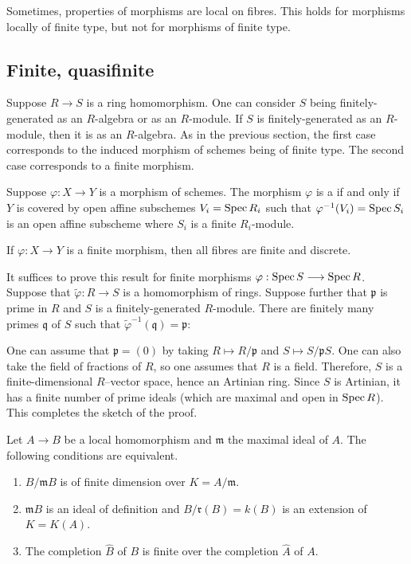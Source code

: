 \documentclass [11 pt, oneside] {article}
\begin{document}
\begin{remark}
	Sometimes, properties of morphisms are local on fibres. This holds for morphisms locally of finite type, but not for morphisms of finite type.
\end{remark}

\subsection{Finite, quasifinite}
Suppose $R\longrightarrow S$ is a ring homomorphism. One can consider $S$ being finitely-generated as an $R$-algebra or as an $R$-module. If $S$ is finitely-generated as an $R$-module, then it is as an $R$-algebra. As in the previous section, the first case corresponds to the induced morphism of schemes being of finite type. The second case corresponds to a finite morphism.

Suppose $\varphi:X\longrightarrow Y$ is a morphism of schemes. The morphism $\varphi$ is a  if and only if $Y$ is covered by open affine subschemes $V_i = \operatorname{Spec} R_i$ such that $\varphi^{-1}(V_i) =\operatorname{Spec} S_i$ is an open affine subscheme where $S_i$ is a finite $R_i$-module. 

\begin{proposition}
If $\varphi:X\longrightarrow Y$ is a finite morphism, then all fibres are finite and discrete.
\end{proposition}

It suffices to prove this result for finite morphisms $\varphi: \operatorname{Spec} S\longrightarrow \operatorname{Spec} R$. Suppose that $\tilde\varphi :R\longrightarrow S$ is a homomorphism of rings. Suppose further that $\mathfrak{p}$ is prime in $R$ and $S$ is a finitely-generated $R$-module. There are finitely many primes $\mathfrak{q}$ of $S$ such that $\tilde\varphi^{-1}(\mathfrak{q})=\mathfrak{p}$: 

One can assume that $\mathfrak{p}=(0)$ by taking $R \longmapsto R/\mathfrak{p}$ and $S\longmapsto S/\mathfrak{p}S$. One can also take the field of fractions of $R$, so one assumes that $R$ is a field. Therefore, $S$ is a finite-dimensional $R$--vector space, hence an Artinian ring. Since $S$ is Artinian, it has a finite number of prime ideals (which are maximal and open in $\operatorname{Spec} R$). This completes the sketch of the proof.

\begin{proposition}\label{}\text{}
Let $A\longrightarrow B$ be a local homomorphism and $\mathfrak{m}$ the maximal ideal of $A$. The following conditions are equivalent.
\begin{enumerate}
	\item $B/\mathfrak{m}B$ is of finite dimension over $K=A/\mathfrak{m}$.
	\item $\mathfrak{m}B$ is an ideal of definition and $B/\mathfrak{r}(B) = k (B)$ is an extension of $K=K(A)$.
	\item The completion $\widehat{B}$ of $B$ is finite over the completion $\widehat{A}$ of $A$.
\end{enumerate}
\end{proposition}
\end{document}
